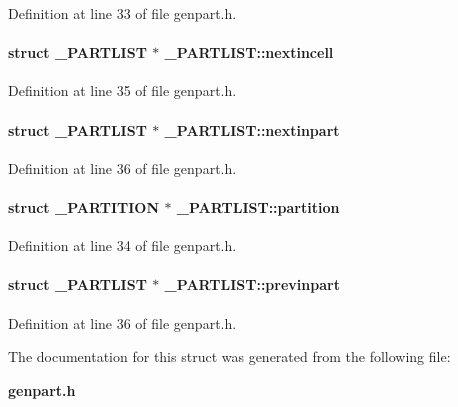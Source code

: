 Definition at line 33 of file genpart.h.\label{_PARTLIST_m4}
\paragraph{\setlength{\rightskip}{0pt plus 5cm}struct \_\-PARTLIST $\ast$ \_\-PARTLIST::nextincell}\hfill



Definition at line 35 of file genpart.h.\label{_PARTLIST_m5}
\paragraph{\setlength{\rightskip}{0pt plus 5cm}struct \_\-PARTLIST $\ast$ \_\-PARTLIST::nextinpart}\hfill



Definition at line 36 of file genpart.h.\label{_PARTLIST_m3}
\paragraph{\setlength{\rightskip}{0pt plus 5cm}struct {\bf \_\-PARTITION} $\ast$ \_\-PARTLIST::partition}\hfill



Definition at line 34 of file genpart.h.\label{_PARTLIST_m6}
\paragraph{\setlength{\rightskip}{0pt plus 5cm}struct \_\-PARTLIST $\ast$ \_\-PARTLIST::previnpart}\hfill



Definition at line 36 of file genpart.h.

The documentation for this struct was generated from the following file:\begin{CompactItemize}
\item 
{\bf genpart.h}\end{CompactItemize}
